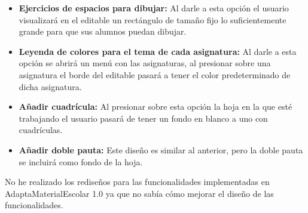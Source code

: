 \begin{itemize}
  \item  \textbf{Ejercicios de espacios para dibujar:} Al darle a esta opción el usuario visualizará en el editable un rectángulo de tamaño fijo lo suficientemente grande para que sus alumnos puedan dibujar.
  \item  \textbf{Leyenda de colores para el tema de cada asignatura:} Al darle a esta opción se abrirá un menú con las asignaturas, al presionar sobre una asignatura el borde del editable pasará a tener el color predeterminado de dicha asignatura.
  \item  \textbf{Añadir cuadrícula:} Al presionar sobre esta opción la hoja en la que esté trabajando el usuario pasará de tener un fondo en blanco a uno con cuadrículas.
  \item \textbf{Añadir doble pauta:} Este diseño es similar al anterior, pero la doble pauta se incluirá como fondo de la hoja. 
\end{itemize}
No he realizado los rediseños para las funcionalidades implementadas en AdaptaMaterialEscolar 1.0  ya que no sabía cómo mejorar el diseño de las funcionalidades. 


